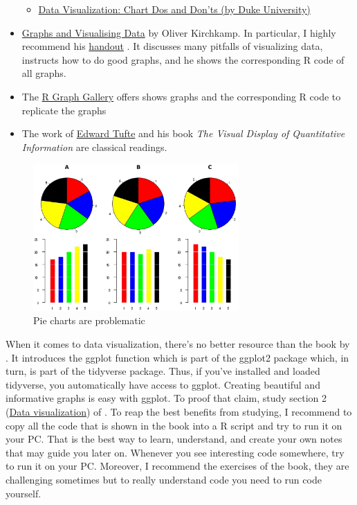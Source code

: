 \documentclass[
  12pt,
  oneside]{book}
\providecommand{\tightlist}{%
  \setlength{\itemsep}{0pt}\setlength{\parskip}{0pt}}
\theoremstyle{definition}
\theoremstyle{definition}
\theoremstyle{definition}
\theoremstyle{definition}
\theoremstyle{remark}
\begin{document}
\begin{itemize}
  \begin{itemize}
  \tightlist
  \item
    \href{https://guides.library.duke.edu/datavis/topten}{Data Visualization: Chart Dos and Don'ts (by Duke University)}
  \end{itemize}
\item
  \href{https://www.kirchkamp.de/graph/}{Graphs and Visualising Data} by Oliver Kirchkamp. In particular, I highly recommend his \href{https://www.kirchkamp.de/oekonometrie/pdf/gra-p.pdf}{handout} \citep{Kirchkamp2018Using}. It discusses many pitfalls of visualizing data, instructs how to do good graphs, and he shows the corresponding R code of all graphs.\\
\item
  The \href{https://www.r-graph-gallery.com}{R Graph Gallery} offers shows graphs and the corresponding R code to replicate the graphs
\item
  The work of \href{www.edwardtufte.com}{Edward Tufte} and his book \emph{The Visual Display of Quantitative Information} \citep{Tufte2022Visual} are classical readings.
\end{itemize}

\begin{figure}
\centering
\includegraphics[width=0.7\textwidth,height=\textheight]{fig/piebad.jpeg}
\caption[\label{fig:piebad} Pie charts are problematic]{\label{fig:piebad} Pie charts are problematic\footnotemark{}}
\end{figure}

When it comes to data visualization, there's no better resource than the book by \citet{Wickham2023R}. It introduces the ggplot function which is part of the ggplot2 package which, in turn, is part of the tidyverse package. Thus, if you've installed and loaded tidyverse, you automatically have access to ggplot. Creating beautiful and informative graphs is easy with ggplot. To proof that claim, study section 2 (\href{https://r4ds.hadley.nz/data-visualize.html}{Data visualization}) of \citet{Wickham2023R}. To reap the best benefits from studying, I recommend to copy all the code that is shown in the book into a R script and try to run it on your PC. That is the best way to learn, understand, and create your own notes that may guide you later on. Whenever you see interesting code somewhere, try to run it on your PC. Moreover, I recommend the exercises of the book, they are challenging sometimes but to really understand code you need to run code yourself.
\end{document}
